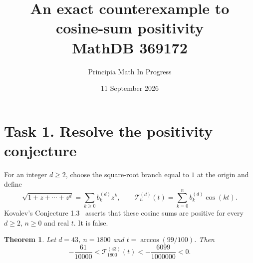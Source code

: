 \documentclass[11pt]{article}
\title{An exact counterexample to cosine-sum positivity\\
\large MathDB 369172}
\author{Principia Math In Progress}
\date{11 September 2026}
\newtheorem{theorem}{Theorem}
\begin{document}
\maketitle

\section*{Task 1. Resolve the positivity conjecture}
For an integer $d\geq2$, choose the square-root branch equal to $1$ at
the origin and define
\[
 \sqrt{1+z+\cdots+z^d}=\sum_{k\geq0}b_k^{(d)}z^k,\qquad
 \mathcal T_n^{(d)}(t)=\sum_{k=0}^n b_k^{(d)}\cos(kt).
\]
Kovalev's Conjecture 1.3~\cite{K} asserts that these cosine sums are
positive for every $d\geq2$, $n\geq0$ and real $t$. It is false.

\begin{theorem}
Let $d=43$, $n=1800$ and $t=\arccos(99/100)$. Then
\[
 -\frac{61}{10000}
 <\mathcal T_{1800}^{(43)}(t)
 <-\frac{6099}{1000000}<0.
\]
\end{theorem}
\end{document}
